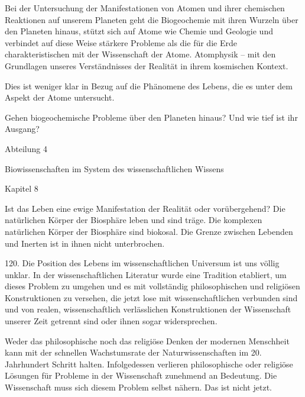 \documentclass[11pt,a4paper]{book}
\begin{document}
Bei der Untersuchung der Manifestationen von Atomen und ihrer chemischen Reaktionen auf unserem Planeten geht die Biogeochemie mit ihren Wurzeln über den Planeten hinaus, stützt sich auf Atome wie Chemie und Geologie und verbindet auf diese Weise stärkere Probleme als die für die Erde charakteristischen mit der Wissenschaft der Atome. Atomphysik -- mit den Grundlagen unseres Verständnisses der Realität in ihrem kosmischen Kontext.



Dies ist weniger klar in Bezug auf die Phänomene des Lebens, die es unter dem Aspekt der Atome untersucht.



Gehen biogeochemische Probleme über den Planeten hinaus? Und wie tief ist ihr Ausgang?



 



Abteilung 4

Biowissenschaften im System des wissenschaftlichen Wissens



 



Kapitel 8



 



Ist das Leben eine ewige Manifestation der Realität oder vorübergehend? Die natürlichen Körper der Biosphäre leben und sind träge. Die komplexen natürlichen Körper der Biosphäre sind biokosal. Die Grenze zwischen Lebenden und Inerten ist in ihnen nicht unterbrochen.



 





120. Die Position des Lebens im wissenschaftlichen Universum ist uns völlig unklar. In der wissenschaftlichen Literatur wurde eine Tradition etabliert, um dieses Problem zu umgehen und es mit vollständig philosophischen und religiösen Konstruktionen zu versehen, die jetzt lose mit wissenschaftlichen verbunden sind und von realen, wissenschaftlich verlässlichen Konstruktionen der Wissenschaft unserer Zeit getrennt sind oder ihnen sogar widersprechen.



Weder das philosophische noch das religiöse Denken der modernen Menschheit kann mit der schnellen Wachstumsrate der Naturwissenschaften im 20. Jahrhundert Schritt halten. Infolgedessen verlieren philosophische oder religiöse Lösungen für Probleme in der Wissenschaft zunehmend an Bedeutung. Die Wissenschaft muss sich diesem Problem selbst nähern. Das ist nicht jetzt.
\end{document}
